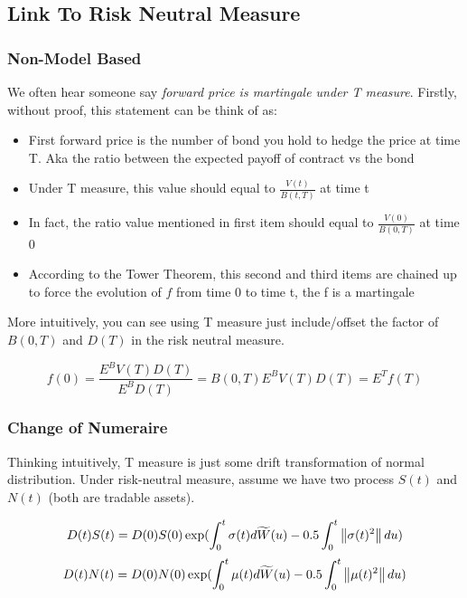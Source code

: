 \subsection{Link To Risk Neutral Measure}
\subsubsection{Non-Model Based}

We often hear someone say {\color{red}\textit{forward price is martingale under T measure}}. Firstly, without proof, this statement can be think of as:
\begin{itemize}
\item First forward price is the number of bond you hold to hedge the price at time T. Aka the ratio between the expected payoff of contract vs the bond
\item Under T measure, this value should equal to $\frac{V(t)}{B(t, T)}$ at time t
\item In fact, the ratio value mentioned in first item should equal to $\frac{V(0)}{B(0, T)} $ at time 0
\item According to the {\color{red}Tower Theorem, this second and third items are chained up to force the evolution of $f$ from time 0 to time t, the f is a martingale}
\end{itemize}

More intuitively, you can see using T measure just include/offset the factor of $B(0, T)$ and $D(T)$ in the risk neutral measure.

\begin{equation}
  f(0) = \frac{E^{B} V(T) D(T)}{E^BD(T)} = B(0, T)E^{B} V(T) D(T) =  E^{T}f(T)
\end{equation}


\subsubsection{Change of Numeraire}
Thinking intuitively, T measure is just some drift transformation of normal distribution. Under risk-neutral measure, assume we have two process $S(t)$ and $N(t)$ (both are tradable assets).

\begin{equation}
  D(t)S(t) = D(0) S(0) \exp(\int_{0}^{t} \sigma(t) d\widetilde{W}(u) - 0.5\int_{0} ^ {t} \left\lVert\sigma(t) ^ 2\right\rVert du)
\end{equation}
\begin{equation}
  D(t)N(t) = D(0) N(0) \exp(\int_{0}^{t} \mu(t) d\widetilde{W}(u) - 0.5\int_{0} ^ {t} \left\lVert\mu(t) ^ 2\right\rVert du)
\end{equation}

